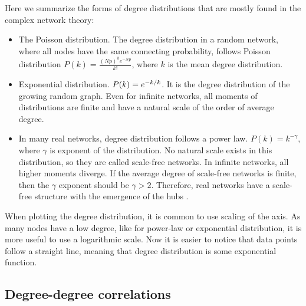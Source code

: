 
Here we summarize the forms of degree distributions that are mostly found in the complex network theory:
\begin{itemize}
	\item The Poisson distribution. The degree distribution in a random network, where all nodes have the same connecting probability, follows Poisson distribution $P(k)= \frac{(Np)^ke^{-Np}}{k!}$, where $k$ is the mean degree distribution. 
	
	\item Exponential distribution. $P(k) = e^{-k/ \- k}$. It is the degree distribution of the growing random graph. Even for infinite networks, all moments of distributions are finite and have a natural scale of the order of average degree.
	
	\item In many real networks, degree distribution follows a power law. $P(k) = k ^ {-\gamma} $, where $\gamma$ is exponent of the distribution. No natural scale exists in this distribution, so they are called scale-free networks. In infinite networks, all higher moments diverge. If the average degree of scale-free networks is finite, then the $\gamma$ exponent should be $\gamma>2$. Therefore, real networks have a scale-free structure with the emergence of the hubs \cite{newman2010}. 
\end{itemize}

When plotting the degree distribution, it is common to use scaling of the axis. As many nodes have a low degree, like for power-law or exponential distribution, it is more useful to use a logarithmic scale. Now it is easier to notice that data points follow a straight line, meaning that degree distribution is some exponential function. 

\subsection{Degree-degree correlations} %

